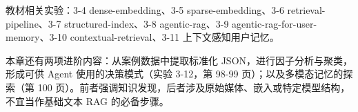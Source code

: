 \documentclass[UTF8,a4paper,11pt]{ctexart}
\newcommand{\code}[1]{{\small\ttfamily #1}}
\begin{document}
教材相关实验：3-4 \code{dense-\allowbreak embedding}、3-5 \code{sparse-\allowbreak embedding}、3-6 \code{retrieval-\allowbreak pipeline}、3-7 \code{structured-\allowbreak index}、3-8 \code{agentic-\allowbreak rag}、3-9 \code{agentic-\allowbreak rag-\allowbreak for-\allowbreak user-\allowbreak memory}、3-10 \code{contextual-\allowbreak retrieval}、3-11 上下文感知用户记忆。

本章还有两项进阶内容：从案例数据中提取标准化 JSON，进行因子分析与聚类，形成可供 Agent 使用的决策模式（实验 3-12，第 98-99 页）；以及多模态记忆的探索（第 100 页）。前者强调知识发现，后者涉及原始媒体、嵌入或特定模型结构，不宜当作基础文本 RAG 的必备步骤。
\end{document}
